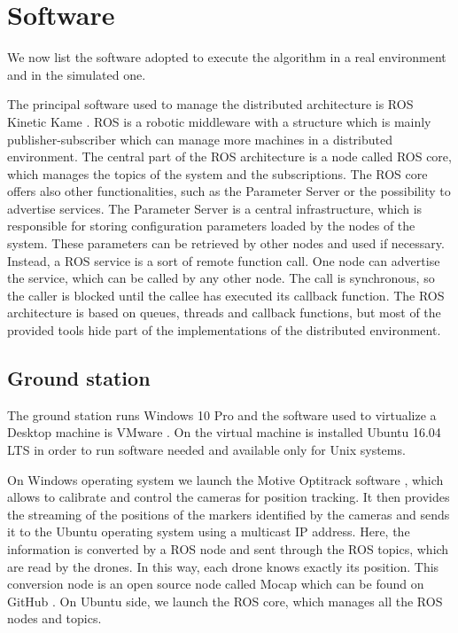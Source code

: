\section{Software}

We now list the software adopted to execute the algorithm
in a real environment and in the simulated one.

The principal software used to manage the distributed architecture is ROS Kinetic
Kame \cite{ros}.
ROS is a robotic middleware with a structure which is mainly publisher-subscriber
which can manage more machines in a distributed environment.
The central part of the ROS architecture is a node called ROS core, which manages
the topics of the system and the subscriptions.
The ROS core offers also other functionalities, such as the Parameter Server or the
possibility to advertise services.
The Parameter Server is a central infrastructure, which is responsible for storing
configuration parameters loaded by the nodes of the system.
These parameters can be retrieved by other nodes and used if necessary.
Instead, a ROS service is a sort of remote function call. One node can advertise
the service, which can be called by any other node. The call is synchronous,
so the caller is blocked until the callee has executed its callback function.
The ROS architecture is based on queues, threads and callback functions, but
most of the provided tools hide part of the implementations of the distributed
environment.


\subsection{Ground station}
The ground station runs Windows 10 Pro \cite{windows} and the software used to virtualize a
Desktop machine is VMware \cite{vmware}.
On the virtual machine is installed Ubuntu 16.04 LTS \cite{ubuntu} in order to run software
needed and available only for Unix systems.

On Windows operating system we launch the Motive Optitrack software \cite{optitrack},
which allows to calibrate and control the cameras for position tracking.
It then provides the streaming of the positions of the markers identified
by the cameras and sends it to the Ubuntu operating system using a multicast IP address.
Here, the information is converted by a ROS node and sent through the ROS topics,
which are read by the drones. In this way, each drone knows exactly its position.
This conversion node is an open source node called Mocap which can be found on GitHub \cite{mocap}.
On Ubuntu side, we launch the ROS core, which manages all the ROS nodes and topics.

